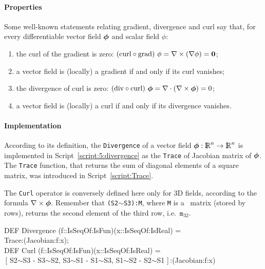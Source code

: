 \documentclass{31x47jw}
\begin{document}
\paragraph{Properties}

Some well-known statements relating gradient, divergence and curl say
that, for every differentiable vector field ${\mbox{\boldmath $\phi$}}$ and 
scalar field $\phi$:
\begin{enumerate}

\item the curl of the gradient is zero: $ (\mbox{curl} \circ
\mbox{grad})\ \phi = \nabla \times (\nabla \phi) = {\mbox{\boldmath $0$}}$;

\item a vector field is (locally) a gradient if and only if its curl vanishes;

\item the divergence of curl is zero: $ (\mbox{div}
\circ \mbox{curl})\ {\mbox{\boldmath $\phi$}} = \nabla \cdot (\nabla \times {\mbox{\boldmath $\phi$}}) =
0$;

\item a vector field is (locally) a curl if and only if its divergence
vanishes.
\end{enumerate}


\paragraph{Implementation}

According to its definition, the \texttt{Divergence} of a
vector field ${\mbox{\boldmath $\phi$}}:\mathbb{I\!\!R}^{n}\rightarrow\mathbb{I\!\!R}^{n}$ is implemented in
Script~\ref{script:5:divergence} as the \texttt{Trace} of Jacobian
matrix of ${\mbox{\boldmath $\phi$}}$.  The \texttt{Trace} function, that returns the
sum of diagonal elements of a square matrix, was introduced in
Script~\ref{script:Trace}.

The \texttt{Curl} operator is conversely defined here only for 3D
fields, according to the formula $\nabla\times{\mbox{\boldmath $\phi$}}$.  Remember that
\texttt{(S2$\sim$S3):M}, where \texttt{M} is a \pl\ matrix (stored by
rows), returns the second element of the third row,
i.e.~$\texttt{m}_{32}$.

\begin{script}
\begin{smallplasm} 
DEF Divergence  (f::IsSeqOf:IsFun)(x::IsSeqOf:IsReal) = \+\\
  Trace:(Jacobian:f:x);\-
  \\[0.3cm]
  
DEF Curl  (f::IsSeqOf:IsFun)(x::IsSeqOf:IsReal) = \+\\
\,[ S2$\sim$S3 - S3$\sim$S2, S3$\sim$S1 - S1$\sim$S3, 
  S1$\sim$S2 - S2$\sim$S1 ]\,:(Jacobian:f:x)

\end{smallplasm} 
\label{script:5:divergence}
\end{script}
\end{document}
